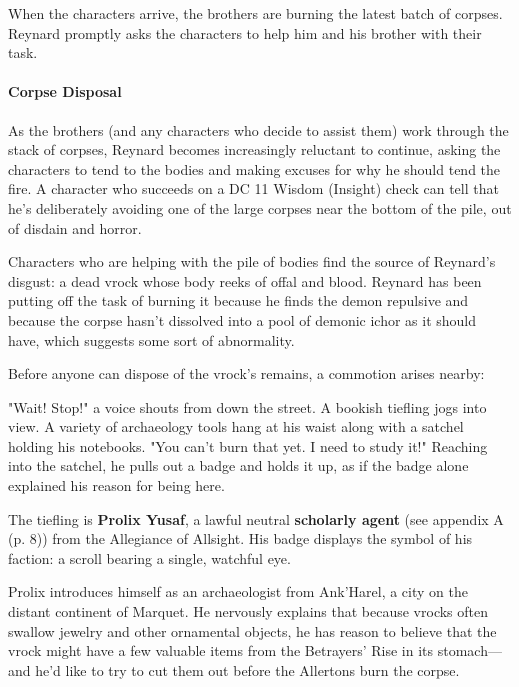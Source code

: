 \documentclass[letterpaper, 11pt, bg=full, twocolumn]{dndbook}
\begin{document}
When the characters arrive, the brothers are burning the latest batch of corpses. Reynard promptly asks the characters to help him and his brother with their task.

\paragraph{Corpse Disposal}

As the brothers (and any characters who decide to assist them) work through the stack of corpses, Reynard becomes increasingly reluctant to continue, asking the characters to tend to the bodies and making excuses for why he should tend the fire. A character who succeeds on a DC 11 Wisdom (Insight) check can tell that he's deliberately avoiding one of the large corpses near the bottom of the pile, out of disdain and horror.

Characters who are helping with the pile of bodies find the source of Reynard's disgust: a dead vrock whose body reeks of offal and blood. Reynard has been putting off the task of burning it because he finds the demon repulsive and because the corpse hasn't dissolved into a pool of demonic ichor as it should have, which suggests some sort of abnormality.

Before anyone can dispose of the vrock's remains, a commotion arises nearby:

\begin{DndReadAloud}
"Wait! Stop!" a voice shouts from down the street. A bookish tiefling jogs into view. A variety of archaeology tools hang at his waist along with a satchel holding his notebooks. "You can't burn that yet. I need to study it!" Reaching into the satchel, he pulls out a badge and holds it up, as if the badge alone explained his reason for being here.
\end{DndReadAloud}

The tiefling is \textbf{Prolix Yusaf}, a lawful neutral \textbf{scholarly agent} (see appendix A (p. 8)) from the Allegiance of Allsight. His badge displays the symbol of his faction: a scroll bearing a single, watchful eye.

Prolix introduces himself as an archaeologist from Ank'Harel, a city on the distant continent of Marquet. He nervously explains that because vrocks often swallow jewelry and other ornamental objects, he has reason to believe that the vrock might have a few valuable items from the Betrayers' Rise in its stomach---and he'd like to try to cut them out before the Allertons burn the corpse.
\end{document}
